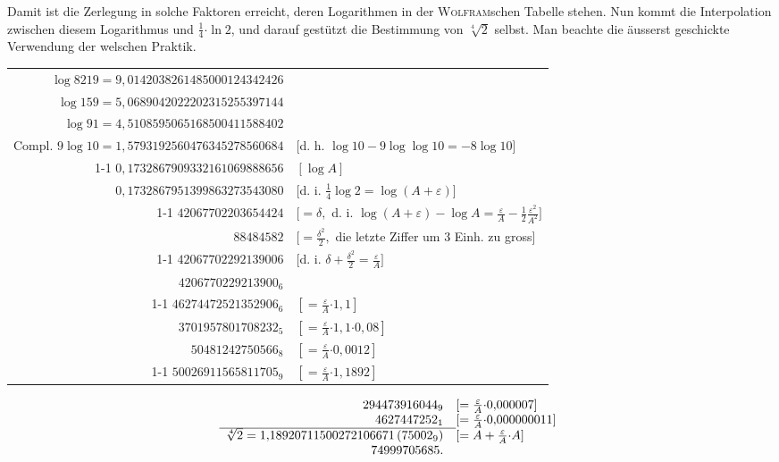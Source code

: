 \par\noindent\hspace*{\parindent}Damit ist die Zerlegung in solche Faktoren erreicht, deren Logarithmen
in der \textsc{Wolfram}schen Tabelle stehen. Nun kommt die Interpolation zwischen
diesem Logarithmus und $\frac14\mathord{\cdot}\ln2$, und darauf gestützt die Bestimmung von $\sqrt[4]{2}$
selbst. Man beachte die äusserst geschickte Verwendung der welschen Praktik.
\begingroup\footnotesize\renewcommand{\arraystretch}{1.4}
\begin{center}
\begin{tabular}{@{}r@{\quad}p{.37\linewidth}@{}}
$\log8219=9{,}0142038261485000124342426$&\\
$\log159=5{,}0689042022202315255397144$&\\
$\log91=4{,}5108595065168500411588402$&\\
$\text{Compl. }9\log10=1{,}5793192560476345278560684$&[d. h. $\log10-9\log\log10=-8\log10$]\\\cline{1-1}
$0{,}1732867909332161069888656$&$[\log A]$\\
$0{,}1732867951399863273543080$&[d. i. $\frac14\log2=\log(A+\varepsilon)$]\\\cline{1-1}
$42067702203654424$&$[=\delta,$ d. i. $\log(A+\varepsilon)-\log A=\frac{\varepsilon}{A}-\frac12\frac{\varepsilon^2}{A^2}]$\\
$88484582$&$[=\frac{\delta^2}{2},$ die letzte Ziffer um 3 Einh. zu gross]\\\cline{1-1}
$42067702292139006$&[d. i. $\delta+\frac{\delta^2}{2}=\frac{\varepsilon}{A}]$\\
$4206770229213900_{6}$&\\\cline{1-1}
$46274472521352906_{6}$&$[=\frac{\varepsilon}{A}\mathord{\cdot}1{,}1]$\\
$3701957801708232_{5}$&$[=\frac{\varepsilon}{A}\mathord{\cdot}1{,}1\mathord{\cdot}0{,}08]$\\
$50481242750566_{8}$&$[=\frac{\varepsilon}{A}\mathord{\cdot}0{,}0012]$\\\cline{1-1}
$50026911565811705_{9}$&$[=\frac{\varepsilon}{A}\mathord{\cdot}1{,}1892]$
\end{tabular}
\end{center}
\endgroup
\clearpage{}
\setcounter{footnote}{0}
\begingroup\small
\[
\begin{array}{r@{\quad}l}
294473916044_{9}&[=\frac{\varepsilon}{A}\mathord{\cdot}0{,}000007]\\
4627447252_{1}&[=\frac{\varepsilon}{A}\mathord{\cdot}0{,}000000011]\\\cline{1-1}
\sqrt[4]{2}=1{,}18920711500272106671\,(75002_{9})&[=A+\frac{\varepsilon}{A}\mathord{\cdot}A]\\
74999705685.&
\end{array}
\]
